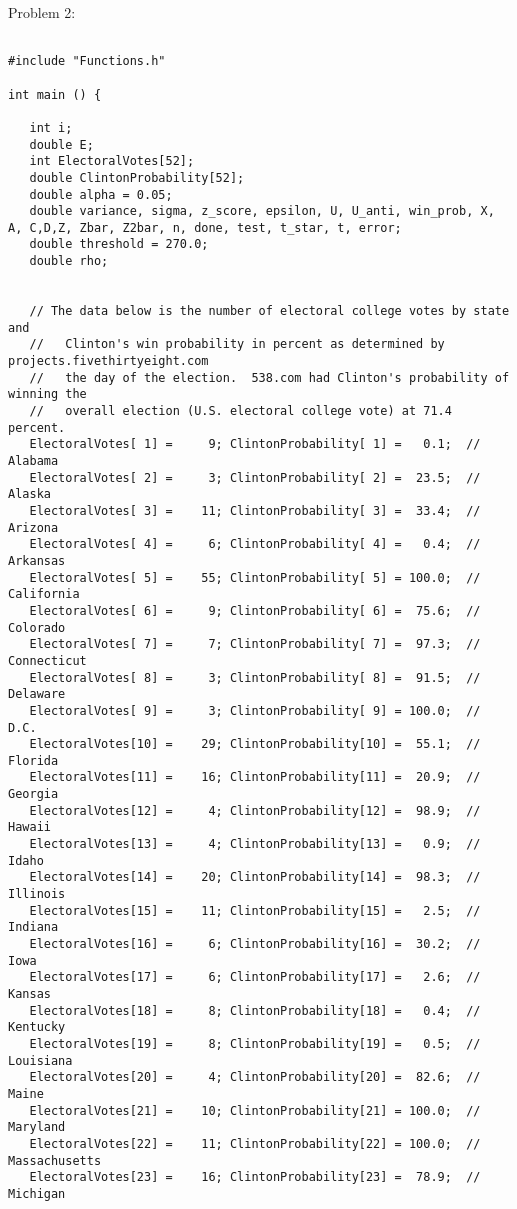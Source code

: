 \documentclass{report}
\begin{document}
Problem 2:
\begin{lstlisting}

#include "Functions.h"

int main () {

   int i;
   double E;
   int ElectoralVotes[52];
   double ClintonProbability[52];
   double alpha = 0.05;
   double variance, sigma, z_score, epsilon, U, U_anti, win_prob, X, A, C,D,Z, Zbar, Z2bar, n, done, test, t_star, t, error; 
   double threshold = 270.0;
   double rho; 


   // The data below is the number of electoral college votes by state and
   //   Clinton's win probability in percent as determined by projects.fivethirtyeight.com
   //   the day of the election.  538.com had Clinton's probability of winning the
   //   overall election (U.S. electoral college vote) at 71.4 percent.
   ElectoralVotes[ 1] =     9; ClintonProbability[ 1] =   0.1;  // Alabama
   ElectoralVotes[ 2] =     3; ClintonProbability[ 2] =  23.5;  // Alaska
   ElectoralVotes[ 3] =    11; ClintonProbability[ 3] =  33.4;  // Arizona
   ElectoralVotes[ 4] =     6; ClintonProbability[ 4] =   0.4;  // Arkansas
   ElectoralVotes[ 5] =    55; ClintonProbability[ 5] = 100.0;  // California
   ElectoralVotes[ 6] =     9; ClintonProbability[ 6] =  75.6;  // Colorado
   ElectoralVotes[ 7] =     7; ClintonProbability[ 7] =  97.3;  // Connecticut
   ElectoralVotes[ 8] =     3; ClintonProbability[ 8] =  91.5;  // Delaware
   ElectoralVotes[ 9] =     3; ClintonProbability[ 9] = 100.0;  // D.C.
   ElectoralVotes[10] =    29; ClintonProbability[10] =  55.1;  // Florida
   ElectoralVotes[11] =    16; ClintonProbability[11] =  20.9;  // Georgia
   ElectoralVotes[12] =     4; ClintonProbability[12] =  98.9;  // Hawaii
   ElectoralVotes[13] =     4; ClintonProbability[13] =   0.9;  // Idaho
   ElectoralVotes[14] =    20; ClintonProbability[14] =  98.3;  // Illinois
   ElectoralVotes[15] =    11; ClintonProbability[15] =   2.5;  // Indiana
   ElectoralVotes[16] =     6; ClintonProbability[16] =  30.2;  // Iowa
   ElectoralVotes[17] =     6; ClintonProbability[17] =   2.6;  // Kansas
   ElectoralVotes[18] =     8; ClintonProbability[18] =   0.4;  // Kentucky
   ElectoralVotes[19] =     8; ClintonProbability[19] =   0.5;  // Louisiana
   ElectoralVotes[20] =     4; ClintonProbability[20] =  82.6;  // Maine
   ElectoralVotes[21] =    10; ClintonProbability[21] = 100.0;  // Maryland
   ElectoralVotes[22] =    11; ClintonProbability[22] = 100.0;  // Massachusetts
   ElectoralVotes[23] =    16; ClintonProbability[23] =  78.9;  // Michigan

\end{lstlisting}
\end{document}
